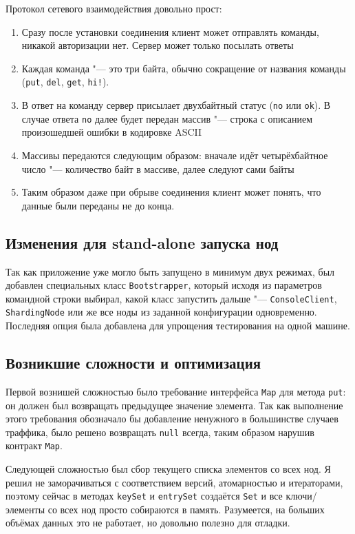 \documentclass[a4paper]{article}
\renewcommand{\t}{\texttt}
\begin{document}
  Протокол сетевого взаимодействия довольно прост:
  \begin{enumerate}
  \item Сразу после установки соединения клиент может отправлять команды, никакой авторизации нет. Сервер может только посылать ответы
  \item Каждая команда "--- это три байта, обычно сокращение от названия команды (\t{put}, \t{del}, \t{get}, \t{hi!}).
  \item В ответ на команду сервер присылает двухбайтный статус (\t{no} или \t{ok}). В случае ответа \t{no}
        далее будет передан массив "--- строка с описанием произошедшей ошибки в кодировке ASCII
  \item Массивы передаются следующим образом: вначале идёт четырёхбайтное число "--- количество байт в массиве,
        далее следуют сами байты
  \item Таким образом даже при обрыве соединения клиент может понять, что данные были переданы не до конца.
  \end{enumerate}

\subsection{Изменения для stand-alone запуска нод}
  Так как приложение уже могло быть запущено в минимум двух режимах, был добавлен специальных
  класс \t{Bootstrapper}, который исходя из параметров командной строки выбирал, какой класс запустить
  дальше "--- \t{ConsoleClient}, \t{ShardingNode} или же все ноды из заданной конфигурации одновременно.
  Последняя опция была добавлена для упрощения тестирования на одной машине.

\subsection{Возникшие сложности и оптимизация}
  Первой вознишей сложностью было требование интерфейса \t{Map} для метода \t{put}: он должен был возвращать
  предыдущее значение элемента. Так как выполнение этого требования обозначало бы добавление
  ненужного в большинстве случаев траффика, было решено возвращать \t{null} всегда, таким образом
  нарушив контракт \t{Map}.

  Следующей сложностью был сбор текущего списка элементов со всех нод. Я решил не заморачиваться с
  соответствием версий, атомарностью и итераторами, поэтому сейчас в методах \t{keySet} и \t{entrySet} создаётся
  \t{Set} и все ключи/элементы со всех нод просто собираются в память. Разумеется, на больших объёмах данных
  это не работает, но довольно полезно для отладки.
\end{document}
